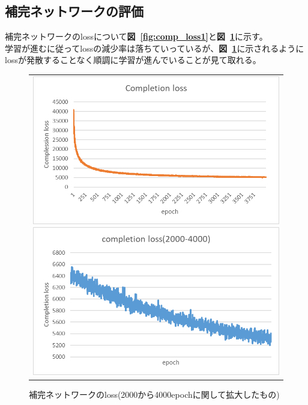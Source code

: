 \documentclass[a4j, 11pt]{jreport}
\newcommand{\figref}[1]{\textbf{図~\ref{#1}}}
\begin{document}
\subsection{補完ネットワークの評価}
補完ネットワークのlossについて\figref{fig:comp_loss1}と\figref{fig:comp_loss2}に示す。\\
学習が進むに従ってlossの減少率は落ちていっているが、\figref{fig:comp_loss2}に示されるようにlossが発散することなく順調に学習が進んでいることが見て取れる。
\begin{figure}[H]
	\centering
	  \begin{tabular}{c}
		\begin{minipage}{0.50\hsize}
		  \centering
			\includegraphics[scale=0.5]
			{images/result/loss/completion_loss1(2).png}
			\caption{補完ネットワークのloss}
			\label{fig:comp_loss1}
		\end{minipage}
   
   
		\begin{minipage}{0.50\hsize}
		  \centering
			\includegraphics[scale=0.5]
							{images/result/loss/completion_loss2(2).png}
							\caption{補完ネットワークのloss(2000から4000epochに関して拡大したもの)}
							\label{fig:comp_loss2}
		\end{minipage} \\
	\end{tabular}
\end{figure}  
\end{document}
